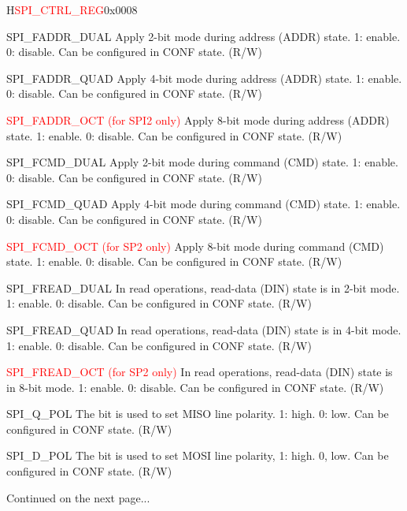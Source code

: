 \begin{register}{H}{\textcolor{red}{SPI\_CTRL\_REG}}{0x{}0008}
\begin{regdesc}
\begin{reglist}
\label{fielddesc:SPIFADDRDUAL}\item [SPI\_FADDR\_DUAL] Apply 2-bit mode during address (ADDR) state. 1: enable. 0: disable. Can be configured in CONF state. (R/W)
\label{fielddesc:SPIFADDRQUAD}\item [SPI\_FADDR\_QUAD] Apply 4-bit mode during address (ADDR) state. 1: enable. 0: disable. Can be configured in CONF state. (R/W)
\label{fielddesc:SPIFADDROCT}\item [\textcolor{red}{SPI\_FADDR\_OCT (for SPI2 only)}] Apply 8-bit mode during address (ADDR) state. 1: enable. 0: disable. Can be configured in CONF state. (R/W)
\label{fielddesc:SPIFCMDDUAL}\item [SPI\_FCMD\_DUAL] Apply 2-bit mode during command (CMD) state. 1: enable. 0: disable. Can be configured in CONF state. (R/W)
\label{fielddesc:SPIFCMDQUAD}\item [SPI\_FCMD\_QUAD] Apply 4-bit mode during command (CMD) state. 1: enable. 0: disable. Can be configured in CONF state. (R/W)
\label{fielddesc:SPIFCMDOCT}\item [\textcolor{red}{SPI\_FCMD\_OCT (for SP2 only)}] Apply 8-bit mode during command (CMD) state. 1: enable. 0: disable. Can be configured in CONF state. (R/W)
\label{fielddesc:SPIFREADDUAL}\item [SPI\_FREAD\_DUAL] In read operations, read-data (DIN) state is in 2-bit mode. 1: enable. 0: disable. Can be configured in CONF state. (R/W)
\label{fielddesc:SPIFREADQUAD}\item [SPI\_FREAD\_QUAD] In read operations, read-data (DIN) state is in 4-bit mode. 1: enable. 0: disable. Can be configured in CONF state. (R/W)
\label{fielddesc:SPIFREADOCT}\item [\textcolor{red}{SPI\_FREAD\_OCT (for SP2 only)}] In read operations, read-data (DIN) state is in 8-bit mode. 1: enable. 0: disable. Can be configured in CONF state. (R/W)
\label{fielddesc:SPIQPOL}\item [SPI\_Q\_POL] The bit is used to set MISO line polarity. 1: high. 0: low. Can be configured in CONF state. (R/W)
\label{fielddesc:SPIDPOL}\item [SPI\_D\_POL] The bit is used to set MOSI line polarity, 1: high. 0, low. Can be configured in CONF state. (R/W)

\item [Continued on the next page...]
\end{reglist}\end{regdesc}
\end{register}

